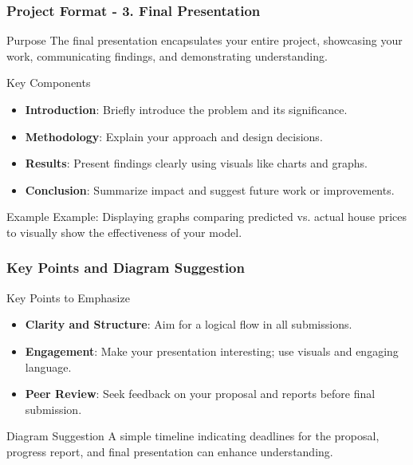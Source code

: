 \documentclass[aspectratio=169]{beamer}
\begin{document}
\begin{frame}[fragile]
    \frametitle{Project Format - 3. Final Presentation}
    \begin{block}{Purpose}
        The final presentation encapsulates your entire project, showcasing your work, communicating findings, and demonstrating understanding.
    \end{block}
    
    \begin{block}{Key Components}
        \begin{itemize}
            \item \textbf{Introduction}: Briefly introduce the problem and its significance.
            \item \textbf{Methodology}: Explain your approach and design decisions.
            \item \textbf{Results}: Present findings clearly using visuals like charts and graphs.
            \item \textbf{Conclusion}: Summarize impact and suggest future work or improvements.
        \end{itemize}
    \end{block}
    
    \begin{block}{Example}
        Example: Displaying graphs comparing predicted vs. actual house prices to visually show the effectiveness of your model.
    \end{block}
\end{frame}

\begin{frame}[fragile]
    \frametitle{Key Points and Diagram Suggestion}
    \begin{block}{Key Points to Emphasize}
        \begin{itemize}
            \item \textbf{Clarity and Structure}: Aim for a logical flow in all submissions.
            \item \textbf{Engagement}: Make your presentation interesting; use visuals and engaging language.
            \item \textbf{Peer Review}: Seek feedback on your proposal and reports before final submission.
        \end{itemize}
    \end{block}

    \begin{block}{Diagram Suggestion}
        A simple timeline indicating deadlines for the proposal, progress report, and final presentation can enhance understanding.
    \end{block}
\end{frame}
\end{document}
